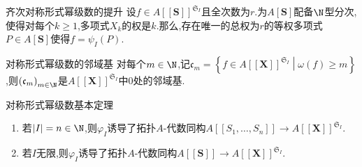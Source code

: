 \begin{lemma}{齐次对称形式幂级数的提升}{}
	设$f\in A[[\mathbf{S}]]^{\mathfrak{S}_{I}}$且全次数为$r$.为$A[\mathbf{S}]$配备$\N$型分次,使得对每个$k\geq 1$,多项式$X_{k}$的权是$k$.那么,存在唯一的总权为$r$的等权多项式$P\in A[\mathbf{S}]$使得$f=\psi_{I}\left(P\right)$.
\end{lemma}

\begin{lemma}{对称形式幂级数的邻域基}{}
	对每个$m\in\N$,记$\mathfrak{c}_{m}=\left\{f\in A[[\mathbf{X}]]^{\mathfrak{S}_{I}}\middle|\omega\left(f\right)\geq m\right\}$,则$\left(\mathfrak{c}_{m}\right)_{m\in\N}$是$A[[\mathbf{X}]]^{\mathfrak{S}_{I}}$中$0$处的邻域基.
\end{lemma}


\begin{theorem}{对称形式幂级数基本定理}{}
	\begin{enumerate}
		\item 若$\left|I\right|=n\in\N$,则$\varphi_{I}$诱导了拓扑$A$-代数同构$A[[S_{1},\ldots,S_{n}]]\to A[[\mathbf{X}]]^{\mathfrak{S}_{I}}$.
		\item 若$I$无限,则$\varphi_{I}$诱导了拓扑$A$-代数同构$A[[\mathbf{S}]]\to A[[\mathbf{X}]]^{\mathfrak{S}_{I}}$.
	\end{enumerate}
\end{theorem}

















































































